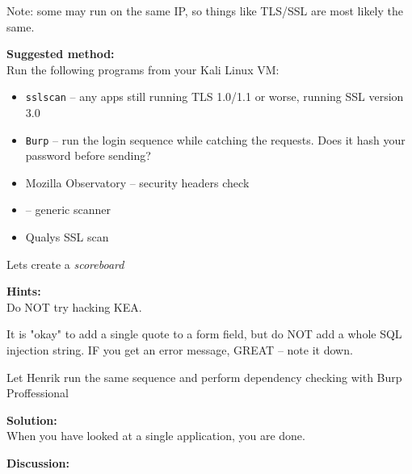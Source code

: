 \documentclass[a4paper,11pt,notitlepage]{report}
\begin{document}
Note: some may run on the same IP, so things like TLS/SSL are most likely the same.

{\bf Suggested method:}\\
Run the following programs from your Kali Linux VM:


\begin{itemize}
\item \verb+sslscan+ -- any apps still running TLS 1.0/1.1 or worse, running SSL version 3.0
\item \verb+Burp+ -- run the login sequence while catching the requests. Does it hash your password before sending?
\item Mozilla Observatory  -- security headers check
\item {}  -- generic scanner
\item Qualys SSL scan 
\end{itemize}

Lets create a \emph{scoreboard}

{\bf Hints:}\\
Do NOT try hacking KEA.

It is "okay" to add a single quote to a form field, but do NOT add a whole SQL injection string. IF you get an error message, GREAT -- note it down.

Let Henrik run the same sequence and perform dependency checking with Burp Proffessional

{\bf Solution:}\\
When you have looked at a single application, you are done.

{\bf Discussion:}\\
\end{document}
